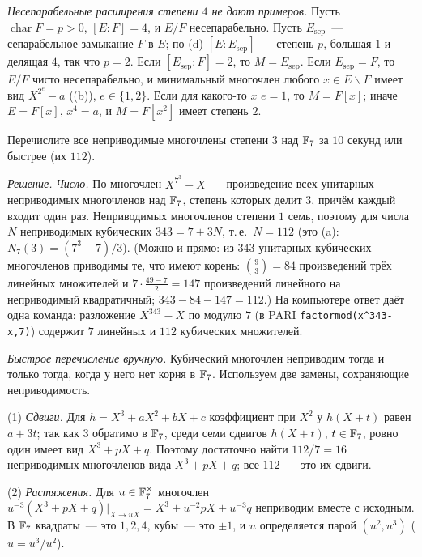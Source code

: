 \begin{remark}
\emph{Несепарабельные расширения степени $4$ не дают примеров.} Пусть $\operatorname{char}F=p>0$, $[E:F]=4$, и $E/F$
несепарабельно. Пусть $E_{\mathrm{sep}}$~--- сепарабельное замыкание $F$ в $E$; по (d) $[E:E_{\mathrm{sep}}]$~--- степень
$p$, большая $1$ и делящая $4$, так что $p=2$. Если $[E_{\mathrm{sep}}:F]=2$, то $M=E_{\mathrm{sep}}$. Если $E_{\mathrm{sep}}=F$, то
$E/F$ чисто несепарабельно, и минимальный многочлен любого $x\in E\smallsetminus F$ имеет вид $X^{2^e}-a$ ((b)), $e\in\{1,2\}$.
Если для какого-то $x$ $e=1$, то $M=F[x]$; иначе $E=F[x]$, $x^4=a$, и $M=F[x^2]$ имеет степень $2$.
\end{remark}

\begin{exercise}[4-5]
Перечислите все неприводимые многочлены степени $3$ над $\mathbb F_7$ за $10$ секунд или быстрее (их $112$).
\end{exercise}

\noindent\emph{Решение.} \emph{Число.} По  многочлен $X^{7^3}-X$~--- произведение всех унитарных неприводимых
многочленов над $\mathbb F_7$, степень которых делит $3$, причём каждый входит один раз. Неприводимых многочленов степени $1$ семь,
поэтому для числа $N$ неприводимых кубических $343=7+3N$, т.\,е.\ $N=112$ (это (a): $N_7(3)=(7^3-7)/3$). (Можно и прямо: из $343$ унитарных кубических
многочленов приводимы те, что имеют корень: $\binom{9}{3}=84$ произведений трёх линейных множителей и
$7\cdot\frac{49-7}2=147$ произведений линейного на неприводимый квадратичный; $343-84-147=112$.) На компьютере ответ даёт
одна команда: разложение $X^{343}-X$ по модулю $7$ (в PARI \texttt{factormod(x\^{}343-x,7)}) содержит $7$ линейных и
$112$ кубических множителей.

\emph{Быстрое перечисление вручную.} Кубический многочлен неприводим тогда и только тогда, когда у него нет корня в $\mathbb F_7$.
Используем две замены, сохраняющие неприводимость.

(1) \emph{Сдвиги.} Для $h=X^3+aX^2+bX+c$ коэффициент при $X^2$ у $h(X+t)$ равен $a+3t$; так как $3$ обратимо в $\mathbb F_7$, среди
семи сдвигов $h(X+t)$, $t\in\mathbb F_7$, ровно один имеет вид $X^3+pX+q$. Поэтому достаточно найти $112/7=16$ неприводимых
многочленов вида $X^3+pX+q$; все $112$~--- это их сдвиги.

(2) \emph{Растяжения.} Для $u\in\mathbb F_7^\times$ многочлен $u^{-3}(X^3+pX+q)\big|_{X\to uX}=X^3+u^{-2}pX+u^{-3}q$ неприводим
вместе с исходным. В $\mathbb F_7$ квадраты~--- это $1,2,4$, кубы~--- это $\pm1$, и $u$ определяется парой $(u^2,u^3)$
($u=u^3/u^2$).

